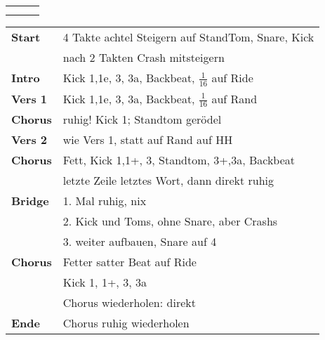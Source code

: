 

\begin{tabular}{p{0.6cm}p{12cm}p{1.4cm}}
	\rowcolor{cyan} \myRow{\thesongnumber} & \myRow{Die Leidenschaft} & \myRow{70} \\
	                                       &                          &            \\
\end{tabular}

\begin{tabular}{p{1.6cm}l}
	\textbf{Start}  & 4 Takte achtel Steigern auf StandTom, Snare, Kick   \\
	                & nach 2 Takten Crash mitsteigern                     \\
	\textbf{Intro}  & Kick 1,1e, 3, 3a, Backbeat, $\frac{1}{16}$ auf Ride \\
	\textbf{Vers 1} & Kick 1,1e, 3, 3a, Backbeat, $\frac{1}{16}$ auf Rand \\
	\textbf{Chorus} & ruhig! Kick 1; Standtom gerödel                     \\
	\textbf{Vers 2} & wie Vers 1, statt auf Rand auf HH                   \\
	\textbf{Chorus} & Fett, Kick 1,1+, 3, Standtom, 3+,3a, Backbeat       \\
	                & letzte Zeile letztes Wort, dann direkt ruhig        \\
	\textbf{Bridge} & 1. Mal ruhig, nix                                   \\
	                & 2. Kick und Toms, ohne Snare, aber Crashs           \\
	                & 3. weiter aufbauen, Snare auf 4                     \\
	\textbf{Chorus} & Fetter satter Beat auf Ride                         \\
	                & Kick 1, 1+, 3, 3a                                   \\
	                & Chorus wiederholen: direkt                          \\
	\textbf{Ende}   & Chorus ruhig wiederholen                            \\
\end{tabular}
